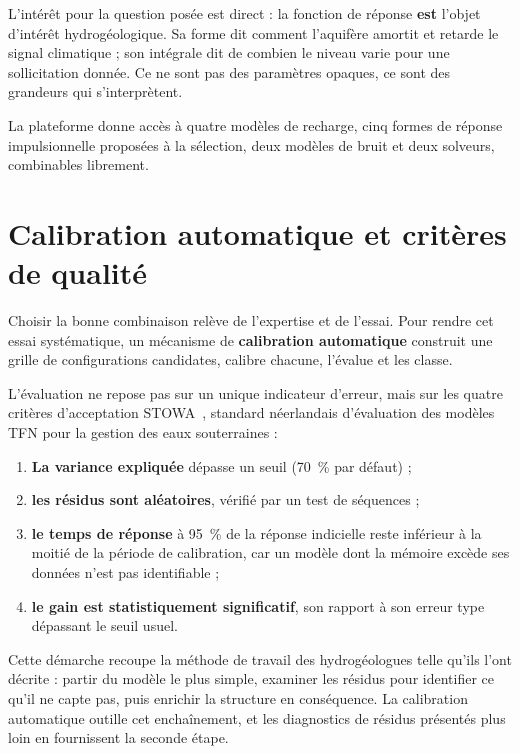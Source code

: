 L'intérêt pour la question posée est direct : la fonction de réponse \textbf{est} l'objet
d'intérêt hydrogéologique. Sa forme dit comment l'aquifère amortit et retarde le signal
climatique ; son intégrale dit de combien le niveau varie pour une sollicitation donnée. Ce ne
sont pas des paramètres opaques, ce sont des grandeurs qui s'interprètent.

La plateforme donne accès à quatre modèles de recharge, cinq formes de réponse impulsionnelle proposées à la sélection,
deux modèles de bruit et deux solveurs, combinables librement.

\section{Calibration automatique et critères de qualité}

Choisir la bonne combinaison relève de l'expertise et de l'essai. Pour rendre cet essai
systématique, un mécanisme de \textbf{calibration automatique} construit une grille de
configurations candidates, calibre chacune, l'évalue et les classe.

L'évaluation ne repose pas sur un unique indicateur d'erreur, mais sur les quatre critères
d'acceptation STOWA~\cite{stowa2021}, standard néerlandais d'évaluation des modèles TFN pour la
gestion des eaux souterraines :

\begin{enumerate}
  \item \textbf{La variance expliquée} dépasse un seuil (\SI{70}{\percent} par défaut) ;
  \item \textbf{les résidus sont aléatoires}, vérifié par un test de séquences ;
  \item \textbf{le temps de réponse} à \SI{95}{\percent} de la réponse indicielle reste inférieur
  à la moitié de la période de calibration, car un modèle dont la mémoire excède ses
  données n'est pas identifiable ;
  \item \textbf{le gain est statistiquement significatif}, son rapport à son erreur type
  dépassant le seuil usuel.
\end{enumerate}

Cette démarche recoupe la méthode de travail des hydrogéologues telle qu'ils l'ont décrite :
partir du modèle le plus simple, examiner les résidus pour identifier ce qu'il ne capte pas,
puis enrichir la structure en conséquence. La calibration automatique outille cet enchaînement,
et les diagnostics de résidus présentés plus loin en fournissent la seconde étape.


